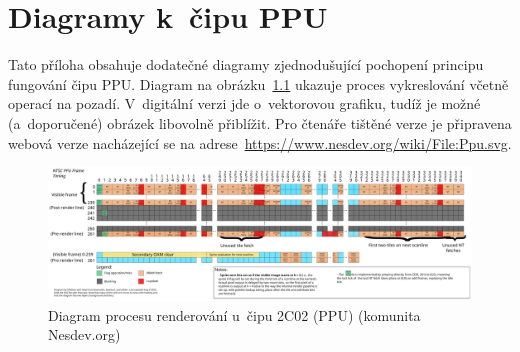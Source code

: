 \chapter{Diagramy k~čipu PPU}
\label{apx:ppu}

Tato příloha obsahuje dodatečné diagramy zjednodušující pochopení principu fungování čipu PPU. Diagram na obrázku~\ref{ppu:renderovani} ukazuje proces vykreslování včetně operací na pozadí. V~digitální verzi jde o~vektorovou grafiku, tudíž je možné (a~doporučené) obrázek libovolně přiblížit. Pro čtenáře tištěné verze je připravena webová verze nacházející se na adrese~\url{https://www.nesdev.org/wiki/File:Ppu.svg}.


\begin{figure}[p]
	\centering
	\caption{Diagram procesu renderování u~čipu 2C02 (PPU) (komunita Nesdev.org)}
	\label{ppu:renderovani}
	\includegraphics[width=1\textheight, angle=270]{images/ppudiag.pdf}
\end{figure}
